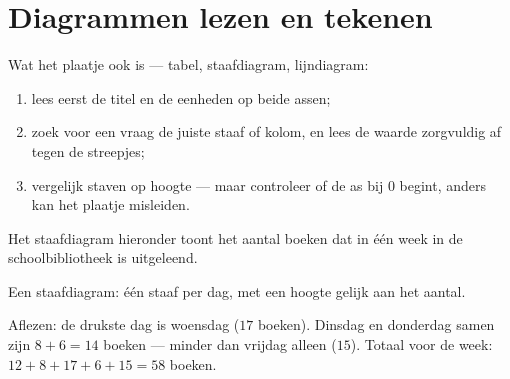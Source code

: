 \section{Diagrammen lezen en tekenen}

\begin{method}\label{met:g6:propdata:read}
Wat het plaatje ook is --- tabel, staafdiagram, lijndiagram:
\begin{enumerate}
  \item lees eerst de titel en de eenheden op beide assen;
  \item zoek voor een vraag de juiste staaf of kolom, en lees de waarde
        zorgvuldig af tegen de streepjes;
  \item vergelijk staven op hoogte --- maar controleer of de as bij $0$ begint,
        anders kan het plaatje misleiden.
\end{enumerate}
\end{method}

\begin{example}\label{ex:g6:propdata:chart}
Het staafdiagram hieronder toont het aantal boeken dat in één week in de
schoolbibliotheek is uitgeleend.

\begin{omfigure}

{\small Een staafdiagram: één staaf per dag, met een hoogte gelijk aan het
aantal.}
\end{omfigure}

Aflezen: de drukste dag is woensdag ($17$ boeken). Dinsdag en donderdag samen
zijn $8 + 6 = 14$ boeken --- minder dan vrijdag alleen ($15$). Totaal voor de
week: $12 + 8 + 17 + 6 + 15 = 58$ boeken.
\end{example}

